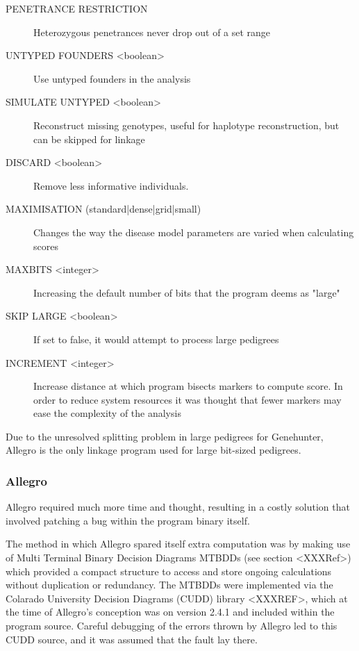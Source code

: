 \begin{description}
\item[\footnotesize PENETRANCE RESTRICTION]{Heterozygous penetrances never drop out of a set range}
\item[\footnotesize UNTYPED FOUNDERS <boolean>]{Use untyped founders in the analysis}
\item[\footnotesize SIMULATE UNTYPED <boolean>]{Reconstruct missing genotypes, useful for haplotype reconstruction, but can be skipped for linkage}
\item[\footnotesize DISCARD <boolean>]{Remove less informative individuals.}
\item[\footnotesize MAXIMISATION (standard|dense|grid|small)]{Changes the way the disease model parameters are varied when calculating scores}
\item[\footnotesize MAXBITS <integer>]{Increasing the default number of bits that the program deems as "large"}
\item[\footnotesize SKIP LARGE <boolean>]{If set to false, it would attempt to process large pedigrees}
\item[\footnotesize INCREMENT <integer>]{Increase distance at which program bisects markers to compute score. In order to reduce system resources it was thought that fewer markers may ease the complexity of the analysis}
\end{description}

Due to the unresolved splitting problem in large pedigrees for Genehunter, Allegro is the only linkage program used for large bit-sized pedigrees.


\subsubsection{Allegro}

Allegro required much more time and thought, resulting in a costly solution that involved patching a bug within the program binary itself.  

The method in which Allegro spared itself extra computation was by making use of Multi Terminal Binary Decision Diagrams \gls{MTBDD}s (see section <XXXRef>) which provided a compact structure to access and store ongoing calculations without duplication or redundancy. The MTBDDs were implemented via the Colarado University Decision Diagrams (\gls{CUDD}) library <XXXREF>, which at the time of Allegro's conception was on version 2.4.1 and included within the program source.  Careful debugging of the errors thrown by Allegro led to this CUDD source, and it was assumed that the fault lay there.

